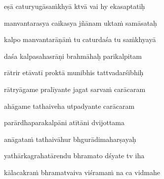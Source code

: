 eṣā caturyugāsa\.mkhyā ktvā vai hy ekasaptatiḥ \veg\dontdisplaylinenum

manvantarasya caikasya jñānam ukta\.m samāsataḥ\thinspace{\dandab} \dontdisplaylinenum

kalpo manvantarāṇā\.m tu caturdaśa tu sa\.mkhyayā \veg\dontdisplaylinenum

daśa kalpasahasrāṇi brahmāhaḥ parikalpitam\thinspace{\dandab} \dontdisplaylinenum

rātrir etāvatī proktā munibhis tattvadarśibhiḥ \veg\dontdisplaylinenum

rātryāgame pralīyante jagat sarva\.m carācaram\thinspace{\dandab} \dontdisplaylinenum

ahāgame tathaiveha utpadyante carācaram \veg\dontdisplaylinenum

parārdhaparakalpāni atītāni dvijottama\thinspace{\dandab} \dontdisplaylinenum

anāgata\.m tathaivāhur bhgurādimaharṣayaḥ \veg\dontdisplaylinenum

yathārkagrahatārendu bhramato dśyate tv iha\thinspace{\dandab} \dontdisplaylinenum

kālacakra\.m bhramatvaiva viśrama\.m na ca vidmahe \veg\dontdisplaylinenum

